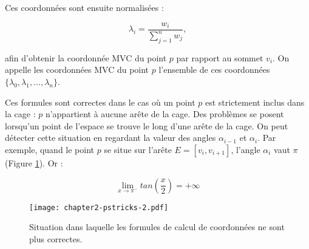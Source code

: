 Ces coordonnées sont ensuite normalisées :

\begin{equation}
  \lambda_i = \frac{w_i}{\sum_{j=1}^n w_j},
\end{equation}

afin d'obtenir la coordonnée MVC du point $p$ par rapport au sommet $v_i$. On
appelle les coordonnées MVC du point $p$ l'ensemble de ces coordonnées
$\{\lambda_0, \lambda_1, ..., \lambda_n\}$.





Ces formules sont correctes dans le cas où un point $p$ est strictement inclus
dans la cage : $p$ n'appartient à aucune arête de la cage. Des problèmes se
posent lorsqu'un point de l'espace se trouve le long d'une arête de la cage.
On peut détecter cette situation en regardant la valeur des angles
$\alpha_{i-1}$ et $\alpha_i$. Par exemple, quand le point $p$ se situe sur
l'arête $E = [v_i,v_{i+1}]$, l'angle $\alpha_i$ vaut $\pi$ (Figure
\ref{DEFinc}). Or :

\begin{displaymath}
  \lim\limits_{x \to \pi^-} tan(\frac{x}{2}) = +\infty
\end{displaymath}

\begin{figure}[ht]
  \begin{center}
    \texttt{[image: chapter2-pstricks-2.pdf]}

    \caption[Cas particulier MVC] {Situation dans laquelle les
formules de calcul de coordonnées ne sont plus correctes.}

    \label{DEFinc}
  \end{center}
\end{figure}

